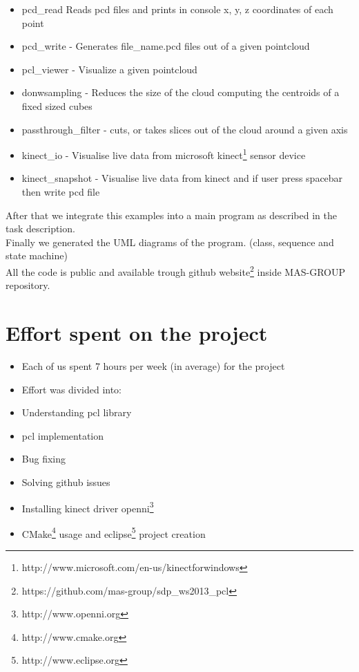 \documentclass[paper=a4, fontsize=12pt]{scrartcl} %
\numberwithin{equation}{section} %
\numberwithin{figure}{section} %
\numberwithin{table}{section} %
\begin{document}
\begin{itemize}
  \item pcd\_read  Reads pcd files and prints in console x, y, z coordinates of each point
  \item pcd\_write - Generates file\_name.pcd files out of a given pointcloud
  \item pcl\_viewer - Visualize a given pointcloud
  \item donwsampling - Reduces the size of the cloud computing the centroids of a fixed sized cubes
  \item passthrough\_filter - cuts, or takes slices out of the cloud around a given axis
  \item kinect\_io - Visualise live data from microsoft kinect\footnote{http://www.microsoft.com/en-us/kinectforwindows} sensor device
  \item kinect\_snapshot - Visualise live data from kinect and if user press spacebar then write pcd file
\end{itemize}

After that we integrate this examples into a main program as described in the task description.
\\[10pt]
Finally we generated the UML diagrams of the program. (class, sequence and state machine)
\\[10pt]
All the code is public and available trough github website\footnote{https://github.com/mas-group/sdp\_ws2013\_pcl} inside MAS-GROUP repository.
\\[10pt]





\section{Effort spent on the project}


\begin{itemize}
  \item Each of us spent 7 hours per week (in average) for the project
  \item Effort was divided into: 
  \item Understanding pcl library
  \item pcl implementation
  \item Bug fixing
  \item Solving github issues
  \item Installing kinect driver openni\footnote{http://www.openni.org}
  \item CMake\footnote{http://www.cmake.org} usage and eclipse\footnote{http://www.eclipse.org} project creation
\end{itemize}
\end{document}
